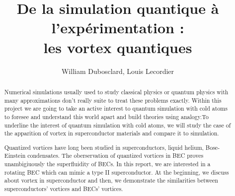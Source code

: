 \documentclass[a4paper]{article}
\title{De la simulation quantique à l'expérimentation : \\ les vortex quantiques}
\author{William Dubosclard, Louis Lecordier}
\begin{document}
\maketitle


\begin{abstract}
Numerical simulations usually used to study classical physics or quantum physics with many approximations don't really suite to treat these problems exactly.
Within this project we are going to take an active interest to quantum simulation with cold atoms to foresee and understand this world apart and build theories using analogy.To underline the interest of quantum simulation with cold atoms, we will study the case of the apparition of vortex in superconductor materials and compare it to simulation.

Quantized vortices have long been studied in superconductors, liquid helium, Bose-Einstein condensates. The oberservation of quantized vortices in BEC proves unambigiuously the superfluidity of BECs. In this report, we are interested in a rotating BEC which can mimic a type II superconductor. At the beginning, we discuss about vortex in superconductor and then, we demonstrate the similarities between superconductors' vortices and BECs' vortices. 
\end{abstract}

\tableofcontents

\newpage
\end{document}
